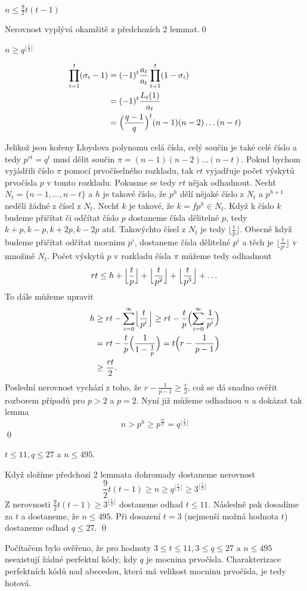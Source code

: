 \lm $n \leq \frac{9}{2} t(t-1)$

\dk Nerovnost vyplývá okamžitě z předchozích 2 lemmat.\qed

\lm $n \geq q^{\lfloor \frac{t}{2} \rfloor}$

\dk
\begin{align*}
\prod\limits_{i = 1}^t (\sigma_i - 1) &= (-1)^t \frac{a_t}{a_t} \prod\limits_{i = 1}^t (1 - \sigma_i) \\
&= (-1)^t \frac{L_t(1)}{a_t} \\
&= \Bigl(\frac{q-1}{q}\Bigr)^t (n-1)(n-2)\dots(n-t)
\end{align*}

Jelikož jsou kořeny Lloydova polynomu celá čísla, celý součin je také celé číslo a tedy $p^{rt} = q^t$ musí dělit součin $\pi = (n-1)(n-2)\dots(n-t)$. Pokud bychom vyjádřili číslo $\pi$ pomocí prvočíselného rozkladu, tak $rt$ vyjadřuje počet výskytů prvočísla $p$ v tomto rozkladu. Pokusme se tedy $rt$ nějak odhadnout. Nechť $ N_t = \{n-1,\dots,n-t\}$ a $h$ je takové číslo, že $p^h$ dělí nějaké číslo z $N_t$ a $p^{h+1}$ nedělí žádné z čísel z $N_t$. Nechť $k$ je takové, že $k = fp^h \in N_t$. Když k číslo $k$ budeme přičítat či odčítat číslo $p$ dostaneme čísla dělitelné $p$, tedy $k + p, k - p, k + 2p, k - 2p$ atd. Takovýchto čísel z $N_t$ je tedy $\lfloor \frac{t}{p} \rfloor$. Obecně když budeme přičítat odčítat mocninu $p^i$, dostaneme čísla dělitelné $p^i$ a těch je $\lfloor \frac{t}{p^i} \rfloor$ v množině $N_t$. Počet výskytů $p$ v rozkladu čísla $\pi$ můžeme tedy odhadnout
\[
rt \leq h + \Bigl\lfloor \frac{t}{p} \Bigr\rfloor + \Bigl\lfloor \frac{t}{p^2} \Bigr\rfloor + \Bigl\lfloor \frac{t}{p^3} \Bigr\rfloor + \dots
\]
To dále můžeme upravit
\begin{align*}
h &\geq rt - \sum\limits_{i=0}^\infty \Bigl\lfloor \frac{t}{p^i} \Bigr\rfloor 
 \geq rt - \frac{t}{p} \Bigl(\sum\limits_{i=0}^\infty  \frac{1}{p^i} \Bigr) \\
& = rt - \frac{t}{p}\Bigl(\frac{1}{1-\frac{1}{p}}\Bigr) 
= t \Bigl(r - \frac{1}{p-1} \Bigr) \\
& \geq \frac{rt}{2}.
\end{align*}
Poslední nerovnost vychází z toho, že $r - \frac{1}{p-1} \geq \frac{r}{2}$, což se dá snadno ověřit rozborem případů pro $p > 2$ a $p = 2$. Nyní již můžeme odhadnou $n$ a dokázat tak lemma
\[
n > p^h \geq p^{\frac{rt}{2}} = q^{\lfloor\frac{t}{2}\rfloor}
\]
\qed

\lm $t \leq 11, q \leq 27$ a $n \leq 495$.

\dk Když složíme předchozí 2 lemmata dohromady dostaneme nerovnost
\[
\frac{9}{2}t(t-1) \geq n \geq q^{\lfloor\frac{t}{2}\rfloor} \geq 3^{\lfloor\frac{t}{2}\rfloor}
\]
Z nerovnosti $\frac{9}{2}t(t-1) \geq 3^{\lfloor\frac{t}{2}\rfloor}$ dostaneme odhad $t \leq 11$. Následně pak dosadíme za $t$ a dostaneme, že $n \leq 495$. Při dosazení $t=3$ (nejmenší možná hodnota $t$) dostaneme odhad $q \leq 27$. \qed

Počítačem bylo ověřeno, že pro hodnoty $3 \leq t \leq 11, 3 \leq q \leq 27$ a $n \leq 495$ neexistují žádné perfektní kódy, kdy $q$ je mocnina prvočísla. Charakterizace perfektních kódů nad abecedou, která má velikost mocninu prvočísla, je tedy hotová.





